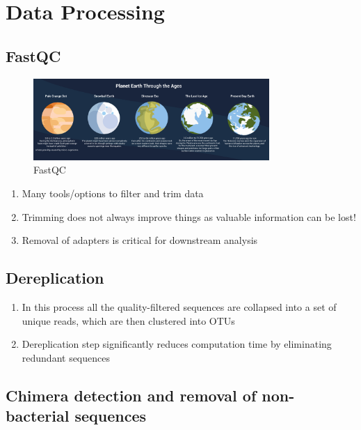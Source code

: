 \documentclass[
]{book}
\providecommand{\tightlist}{%
  \setlength{\itemsep}{0pt}\setlength{\parskip}{0pt}}
\begin{document}
\hypertarget{data-processing}{%
\section*{Data Processing}\label{data-processing}}

\hypertarget{fastqc}{%
\subsection{FastQC}\label{fastqc}}

\begin{figure}
\centering
\includegraphics[width=0.8\textwidth,height=\textheight]{./Figures/Planets.png}
\caption{FastQC}
\end{figure}

\begin{enumerate}
\def\labelenumi{\arabic{enumi}.}
\tightlist
\item
  Many tools/options to filter and trim data
\item
  Trimming does not always improve things as valuable information
  can be lost!
\item
  Removal of adapters is critical for downstream analysis
\end{enumerate}

\hypertarget{dereplication}{%
\subsection{Dereplication}\label{dereplication}}

\begin{enumerate}
\def\labelenumi{\arabic{enumi}.}
\tightlist
\item
  In this process all the quality-filtered sequences are collapsed into a set of unique reads, which are then clustered into OTUs
\item
  Dereplication step significantly reduces computation time by eliminating redundant sequences
\end{enumerate}

\hypertarget{chimera-detection-and-removal-of-non-bacterial-sequences}{%
\subsection{Chimera detection and removal of non-bacterial sequences}\label{chimera-detection-and-removal-of-non-bacterial-sequences}}
\end{document}
